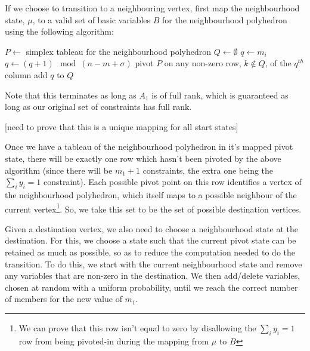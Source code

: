 \documentclass{article}
\begin{document}
If we choose to transition to a neighbouring vertex, first map the neighbourhood state, $\mu$, to a valid set of basic variables $B$ for the neighbourhood polyhedron using the following algorithm:

\begin{algorithmic}
\STATE $P \leftarrow$ simplex tableau for the neighbourhood polyhedron
\STATE $Q \leftarrow \emptyset$
\STATE $q \leftarrow m_i$
\STATE $q \leftarrow (q + 1) \mod (n-m+\sigma)$
\ENDWHILE
\STATE pivot $P$ on any non-zero row, $k \notin Q$, of the $q^{th}$ column
\STATE add $q$ to $Q$
\ENDFOR
\end{algorithmic}

Note that this terminates as long as $A_1$ is of full rank, which is guaranteed as long as our original set of constraints has full rank.

[need to prove that this is a unique mapping for all start states]

Once we have a tableau of the neighbourhood polyhedron in it's mapped pivot state, there will be exactly one row which hasn't been pivoted by the above algorithm (since there will be $m_1+1$ constraints, the extra one being the $\sum_i y_i = 1$ constraint). Each possible pivot point on this row identifies a vertex of the neighbourhood polyhedron, which itself maps to a possible neighbour of the current vertex\footnote{We can prove that this row isn't equal to zero by disallowing the $\sum_i y_i = 1$ row  from being pivoted-in during the mapping from $\mu$ to $B$}. So, we take this set to be the set of possible destination vertices.


Given a destination vertex, we also need to choose a neighbourhood state at the destination. For this, we choose a state such that the current pivot state can be retained as much as possible, so as to reduce the computation needed to do the transition. To do this, we start with the current neighbourhood state and remove any variables that are non-zero in the destination. We then add/delete variables, chosen at random with a uniform probability, until we reach the correct number of members for the new value of $m_1$.
\end{document}
